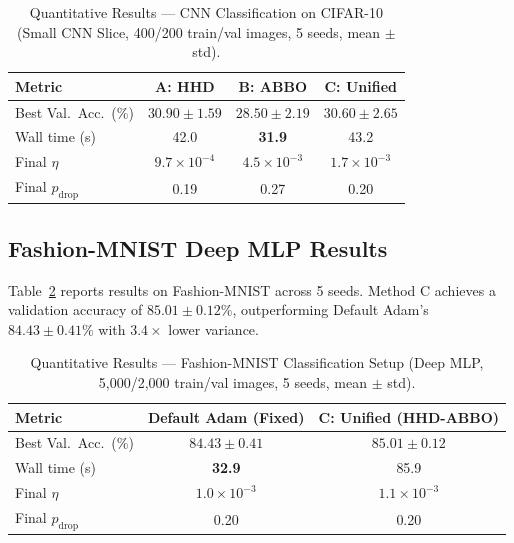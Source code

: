 \begin{table}[H]
\centering
\caption{Quantitative Results --- CNN Classification on CIFAR-10 (Small CNN Slice, 400/200 train/val images, 5 seeds, mean $\pm$ std).}
\label{tab:cnn_results}
\renewcommand{\arraystretch}{1.25}
\begin{tabular}{lccc}
\toprule
\textbf{Metric}
  & \textbf{A: HHD}
  & \textbf{B: ABBO}
  & \textbf{C: Unified} \\
\midrule
Best Val.\ Acc.\ (\%)  & $30.90\pm1.59$ & $28.50\pm2.19$ & $\mathbf{30.60\pm2.65}$ \\
Wall time (s)          & 42.0            & \textbf{31.9}  & 43.2 \\
Final $\eta$           & $9.7{\times}10^{-4}$ & $4.5{\times}10^{-3}$ & $1.7{\times}10^{-3}$ \\
Final $p_{\mathrm{drop}}$ & 0.19 & 0.27 & 0.20 \\
\bottomrule
\end{tabular}
\end{table}

\subsection{Fashion-MNIST Deep MLP Results}

Table~\ref{tab:fmnist_results} reports results on Fashion-MNIST across 5 seeds. Method C achieves a validation accuracy of $85.01\pm0.12\%$, outperforming Default Adam's $84.43\pm0.41\%$ with $3.4\times$ lower variance.

\begin{table}[H]
\centering
\caption{Quantitative Results --- Fashion-MNIST Classification Setup (Deep MLP, 5,000/2,000 train/val images, 5 seeds, mean $\pm$ std).}
\label{tab:fmnist_results}
\renewcommand{\arraystretch}{1.25}
\begin{tabular}{lcc}
\toprule
\textbf{Metric}
  & \textbf{Default Adam (Fixed)}
  & \textbf{C: Unified (HHD-ABBO)} \\
\midrule
Best Val.\ Acc.\ (\%)  & $84.43\pm0.41$ & $\mathbf{85.01\pm0.12}$ \\
Wall time (s)          & \textbf{32.9}  & 85.9 \\
Final $\eta$           & $1.0{\times}10^{-3}$ & $1.1{\times}10^{-3}$ \\
Final $p_{\mathrm{drop}}$ & 0.20 & 0.20 \\
\bottomrule
\end{tabular}
\end{table}

